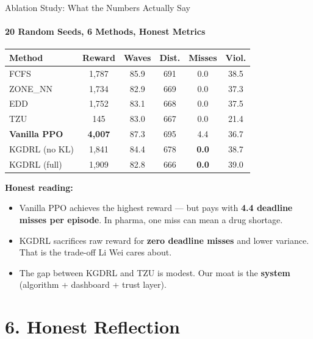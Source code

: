 \documentclass{beamer}
\begin{document}
\begin{frame}{Ablation Study: What the Numbers Actually Say}
  \framesubtitle{20 Random Seeds, 6 Methods, Honest Metrics}
  \small

  \begin{center}
    \footnotesize
    \begin{tabular}{lccccc}
      \toprule
      \textbf{Method} & \textbf{Reward} & \textbf{Waves} & \textbf{Dist.} & \textbf{Misses} & \textbf{Viol.} \\
      \midrule
      FCFS & 1,787 & 85.9 & 691 & 0.0 & 38.5 \\
      ZONE\_NN & 1,734 & 82.9 & 669 & 0.0 & 37.3 \\
      EDD & 1,752 & 83.1 & 668 & 0.0 & 37.5 \\
      TZU & 145 & 83.0 & 667 & 0.0 & 21.4 \\
      \midrule
      \textbf{Vanilla PPO} & \textbf{4,007} & 87.3 & 695 & 4.4 & 36.7 \\
      KGDRL (no KL) & 1,841 & 84.4 & 678 & \textbf{0.0} & 38.7 \\
      KGDRL (full) & 1,909 & 82.8 & 666 & \textbf{0.0} & 39.0 \\
      \bottomrule
    \end{tabular}
  \end{center}

  \vspace{0.2cm}
  \textbf{Honest reading:}
  \begin{itemize}
    \item Vanilla PPO achieves the highest reward --- but pays with \textbf{4.4 deadline misses per episode}. In pharma, one miss can mean a drug shortage.
    \item KGDRL sacrifices raw reward for \textbf{zero deadline misses} and lower variance. That is the trade-off Li Wei cares about.
    \item The gap between KGDRL and TZU is modest. Our moat is the \textbf{system} (algorithm + dashboard + trust layer).
  \end{itemize}
\end{frame}

\section{6. Honest Reflection}
\end{document}
